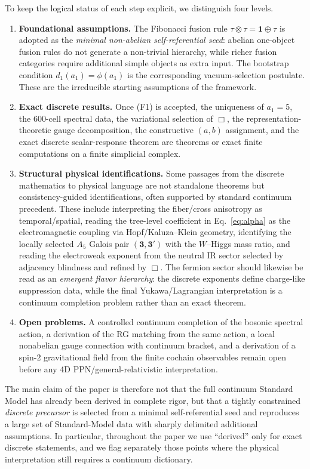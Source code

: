 \documentclass[12pt,a4paper]{article}
\theoremstyle{definition}
\begin{document}
To keep the logical status of each step explicit, we distinguish four levels.
\begin{enumerate}
\item[\textup{(F1)}] \textbf{Foundational assumptions.}  The Fibonacci fusion rule $\tau \otimes \tau = \mathbf{1} \oplus \tau$ is adopted as the \emph{minimal non-abelian self-referential seed}: abelian one-object fusion rules do not generate a non-trivial hierarchy, while richer fusion categories require additional simple objects as extra input.  The bootstrap condition $d_1(a_1)=\phi(a_1)$ is the corresponding vacuum-selection postulate.  These are the irreducible starting assumptions of the framework.
\item[\textup{(F2)}] \textbf{Exact discrete results.}  Once (F1) is accepted, the uniqueness of $a_1=5$, the 600-cell spectral data, the variational selection of $\Box$, the representation-theoretic gauge decomposition, the constructive $(a,b)$ assignment, and the exact discrete scalar-response theorem are theorems or exact finite computations on a finite simplicial complex.
\item[\textup{(F3)}] \textbf{Structural physical identifications.}  Some passages from the discrete mathematics to physical language are not standalone theorems but consistency-guided identifications, often supported by standard continuum precedent.  These include interpreting the fiber/cross anisotropy as temporal/spatial, reading the tree-level coefficient in Eq.~\eqref{eq:alpha} as the electromagnetic coupling via Hopf/Kaluza--Klein geometry, identifying the locally selected $A_5$ Galois pair $(\mathbf{3},\mathbf{3'})$ with the $W$--Higgs mass ratio, and reading the electroweak exponent from the neutral IR sector selected by adjacency blindness and refined by $\Box$.  The fermion sector should likewise be read as an \emph{emergent flavor hierarchy}: the discrete exponents define charge-like suppression data, while the final Yukawa/Lagrangian interpretation is a continuum completion problem rather than an exact theorem.
\item[\textup{(F4)}] \textbf{Open problems.}  A controlled continuum completion of the bosonic spectral action, a derivation of the RG matching from the same action, a local nonabelian gauge connection with continuum bracket, and a derivation of a spin-2 gravitational field from the finite cochain observables remain open before any 4D PPN/general-relativistic interpretation.
\end{enumerate}
The main claim of the paper is therefore not that the full continuum Standard Model has already been derived in complete rigor, but that a tightly constrained \emph{discrete precursor} is selected from a minimal self-referential seed and reproduces a large set of Standard-Model data with sharply delimited additional assumptions.  In particular, throughout the paper we use ``derived'' only for exact discrete statements, and we flag separately those points where the physical interpretation still requires a continuum dictionary.
\end{document}
